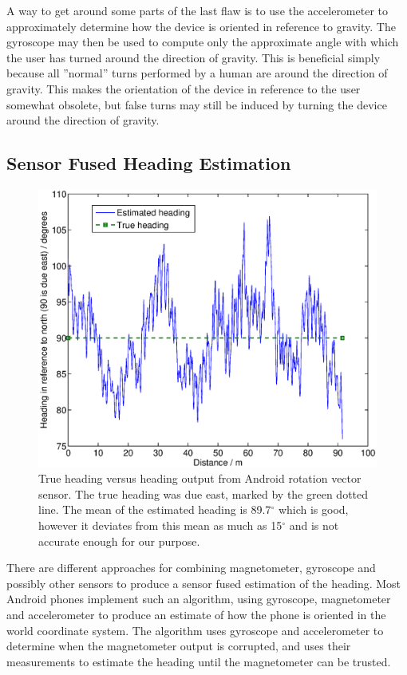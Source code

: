 \documentclass{LTHthesis}
\begin{document}
A way to get around some parts of the last flaw is to use the accelerometer to approximately determine how the device is oriented in reference to gravity. The gyroscope may then be used to compute only the approximate angle with which the user has turned around the direction of gravity. This is beneficial simply because all ''normal'' turns performed by a human are around the direction of gravity. This makes the orientation of the device in reference to the user somewhat obsolete, but false turns may still be induced by turning the device around the direction of gravity.
% 
\subsection{Sensor Fused Heading Estimation}
%
\begin{figure}[!hbt]

\includegraphics[width=1\textwidth ]{images/kinematic/rot_test}
\caption{True heading versus heading output from Android rotation vector sensor. The true heading was due east, marked by the green dotted line. The mean of the estimated heading is 89.7$^\circ$ which is good, however it deviates from this mean as much as 15$^\circ$ and is not accurate enough for our purpose.}\label{rot_test}
\end{figure}
%
There are different approaches for combining magnetometer, gyroscope and possibly other sensors to produce a sensor fused estimation of the heading. Most Android phones implement such an algorithm, using gyroscope, magnetometer and accelerometer to produce an estimate of how the phone is oriented in the world coordinate system. The algorithm uses gyroscope and accelerometer to determine when the magnetometer output is corrupted, and uses their measurements to estimate the heading until the magnetometer can be trusted. 
\end{document}
